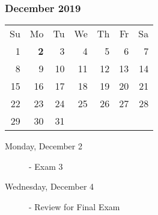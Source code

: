 \subsubsection*{December 2019}
\begin{tabular}{rrrrrrr}
Su & Mo & Tu & We & Th & Fr & Sa\\
 1 &  {\bf 2} &  3 &  4 &  5 &  6 &  7\\
 8 &  9 & 10 & 11 & 12 & 13 & 14\\
15 & 16 & 17 & 18 & 19 & 20 & 21\\
22 & 23 & 24 & 25 & 26 & 27 & 28\\
29 & 30 & 31 &    &    &    &   \\
\end{tabular}
\begin{description}
\item[Monday, December 2]
  - Exam 3
\item[Wednesday, December 4]
  - Review for Final Exam
\end{description}

\hrulefill
